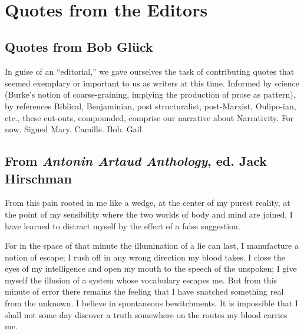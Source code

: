 \documentclass[
]{memoir}
\begin{document}
~

\hypertarget{quotes-from-the-editors}{%
\chapter{Quotes from the Editors}\label{quotes-from-the-editors}}

\hypertarget{quotes-from-bob-gluxfcck}{%
\section*{Quotes from Bob Glück}\label{quotes-from-bob-gluxfcck}}

In guise of an ``editorial,'' we gave ourselves the task of contributing
quotes that seemed exemplary or important to us as writers at this time.
Informed by science (Burke's notion of coarse-graining, implying the
production of prose as pattern), by references Biblical, Benjaminian,
post structuralist, post-Marxist, Oulipo-ian, etc., these cut-outs,
compounded, comprise our narrative about Narrativity. For now. Signed
Mary. Camille. Bob. Gail. ~

\hypertarget{from-antonin-artaud-anthology-ed.-jack-hirschman}{%
\section*{\texorpdfstring{From \emph{Antonin Artaud Anthology}, ed. Jack
Hirschman}{From Antonin Artaud Anthology, ed. Jack Hirschman}}\label{from-antonin-artaud-anthology-ed.-jack-hirschman}}

From this pain rooted in me like a wedge, at the center of my purest
reality, at the point of my sensibility where the two worlds of body and
mind are joined, I have learned to distract myself by the effect of a
false suggestion.

For in the space of that minute the illumination of a lie can last, I
manufacture a notion of escape; I rush off in any wrong direction my
blood takes. I close the eyes of my intelligence and open my mouth to
the speech of the unspoken; I give myself the illusion of a system whose
vocabulary escapes me. But from this minute of error there remains the
feeling that I have snatched something real from the unknown. I believe
in spontaneous bewitchments. It is impossible that I shall not some day
discover a truth somewhere on the routes my blood carries me.
\end{document}
